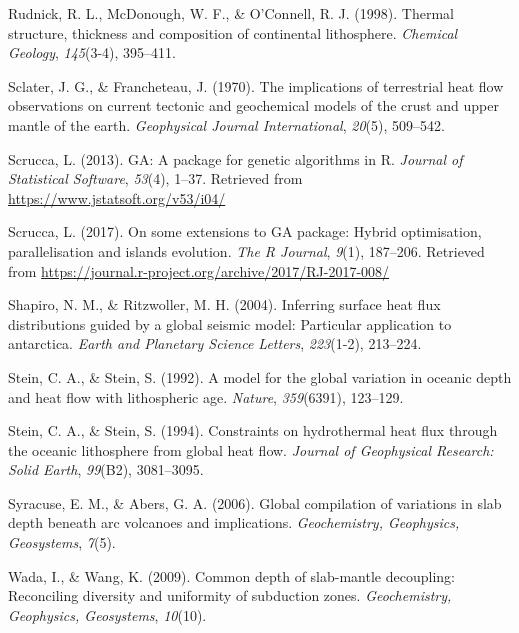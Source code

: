 \documentclass[draft,linenumbers]{agujournal2018}
\begin{document}
\leavevmode{}%
Rudnick, R. L., McDonough, W. F., \& O'Connell, R. J. (1998). Thermal
structure, thickness and composition of continental lithosphere.
\emph{Chemical Geology}, \emph{145}(3-4), 395--411.

\leavevmode{}%
Sclater, J. G., \& Francheteau, J. (1970). The implications of
terrestrial heat flow observations on current tectonic and geochemical
models of the crust and upper mantle of the earth. \emph{Geophysical
Journal International}, \emph{20}(5), 509--542.

\leavevmode{}%
Scrucca, L. (2013). {GA}: A package for genetic algorithms in {R}.
\emph{Journal of Statistical Software}, \emph{53}(4), 1--37. Retrieved
from \url{https://www.jstatsoft.org/v53/i04/}

\leavevmode{}%
Scrucca, L. (2017). On some extensions to {GA} package: Hybrid
optimisation, parallelisation and islands evolution. \emph{The R
Journal}, \emph{9}(1), 187--206. Retrieved from
\url{https://journal.r-project.org/archive/2017/RJ-2017-008/}

\leavevmode{}%
Shapiro, N. M., \& Ritzwoller, M. H. (2004). Inferring surface heat flux
distributions guided by a global seismic model: Particular application
to antarctica. \emph{Earth and Planetary Science Letters},
\emph{223}(1-2), 213--224.

\leavevmode{}%
Stein, C. A., \& Stein, S. (1992). A model for the global variation in
oceanic depth and heat flow with lithospheric age. \emph{Nature},
\emph{359}(6391), 123--129.

\leavevmode{}%
Stein, C. A., \& Stein, S. (1994). Constraints on hydrothermal heat flux
through the oceanic lithosphere from global heat flow. \emph{Journal of
Geophysical Research: Solid Earth}, \emph{99}(B2), 3081--3095.

\leavevmode{}%
Syracuse, E. M., \& Abers, G. A. (2006). Global compilation of
variations in slab depth beneath arc volcanoes and implications.
\emph{Geochemistry, Geophysics, Geosystems}, \emph{7}(5).

\leavevmode{}%
Wada, I., \& Wang, K. (2009). Common depth of slab-mantle decoupling:
Reconciling diversity and uniformity of subduction zones.
\emph{Geochemistry, Geophysics, Geosystems}, \emph{10}(10).
\end{document}
